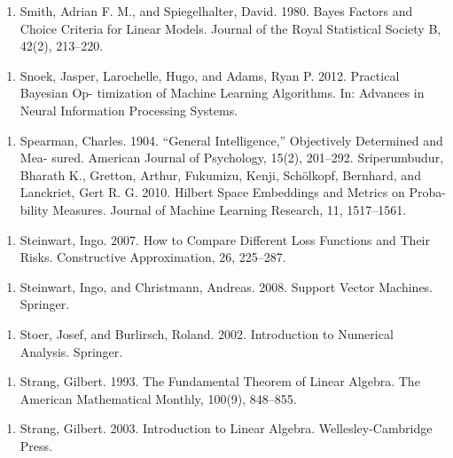 \begin{enumerate}
\item Smith, Adrian F. M., and Spiegelhalter, David. 1980. Bayes Factors and Choice Criteria for Linear Models. Journal of the Royal Statistical Society B, 42(2), 213–220.
\end{enumerate}

\begin{enumerate}
\item Snoek, Jasper, Larochelle, Hugo, and Adams, Ryan P. 2012. Practical Bayesian Op- timization of Machine Learning Algorithms. In: Advances in Neural Information Processing Systems.
\end{enumerate}

\begin{enumerate}
\item Spearman, Charles. 1904. “General Intelligence,” Objectively Determined and Mea- sured. American Journal of Psychology, 15(2), 201–292. Sriperumbudur, Bharath K., Gretton, Arthur, Fukumizu, Kenji, Schölkopf, Bernhard, and Lanckriet, Gert R. G. 2010. Hilbert Space Embeddings and Metrics on Proba- bility Measures. Journal of Machine Learning Research, 11, 1517–1561.
\end{enumerate}

\begin{enumerate}
\item Steinwart, Ingo. 2007. How to Compare Different Loss Functions and Their Risks. Constructive Approximation, 26, 225–287.
\end{enumerate}

\begin{enumerate}
\item Steinwart, Ingo, and Christmann, Andreas. 2008. Support Vector Machines. Springer.
\end{enumerate}

\begin{enumerate}
\item Stoer, Josef, and Burlirsch, Roland. 2002. Introduction to Numerical Analysis. Springer.
\end{enumerate}

\begin{enumerate}
\item Strang, Gilbert. 1993. The Fundamental Theorem of Linear Algebra. The American Mathematical Monthly, 100(9), 848–855.
\end{enumerate}

\begin{enumerate}
\item Strang, Gilbert. 2003. Introduction to Linear Algebra. Wellesley-Cambridge Press.
\end{enumerate}

